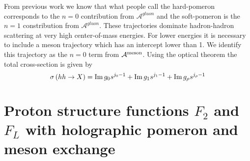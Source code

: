 \documentclass[10 pt]{article}
\begin{document}
From previous work we know that what people call the hard-pomeron corresponds to the $n=0$ contribution from $\mathcal{A}^{gluon}$ and the soft-pomeron is the $n=1$ constribution from $\mathcal{A}^{gluon}$. These trajectories dominate hadron-hadron scattering at very high center-of-mass energies. For lower energies it is necessary to include a meson trajectory which has an intercept lower than 1. We identify this trajectory as the $n=0$ term from $\mathcal{A}^{\rm {meson}}$. Using the optical theorem the total cross-section is given by
\begin{equation}
\sigma\left(h h \rightarrow X\right) = {\rm Im} \, g_0 s^{j_0 - 1} +  {\rm Im} \, g_1 s^{j_1 - 1} +  {\rm Im} \, g_\rho s^{j_\rho - 1}
\end{equation}

\section{Proton structure functions $F_2$ and $F_L$ with holographic pomeron and meson exchange}
\end{document}

